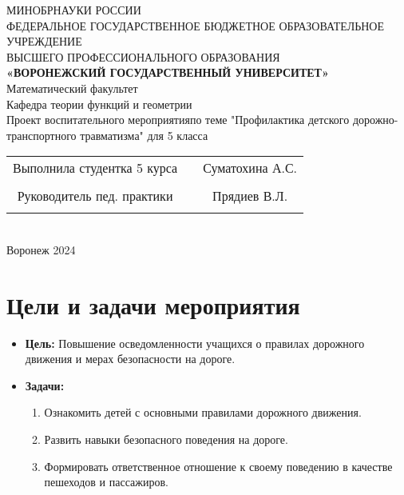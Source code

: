 \documentclass[a4paper,12pt]{article}
\begin{document}
\begin{center}
	\hfill \break
	\large{МИНОБРНАУКИ РОССИИ}\\
	\footnotesize{ФЕДЕРАЛЬНОЕ ГОСУДАРСТВЕННОЕ БЮДЖЕТНОЕ ОБРАЗОВАТЕЛЬНОЕ УЧРЕЖДЕНИЕ}\\
	\footnotesize{ВЫСШЕГО ПРОФЕССИОНАЛЬНОГО ОБРАЗОВАНИЯ}\\
	\small{\textbf{«ВОРОНЕЖСКИЙ ГОСУДАРСТВЕННЫЙ УНИВЕРСИТЕТ»}}\\
	\hfill \break
	\normalsize{Математический факультет}\\
	\hfill \break
	\normalsize{Кафедра теории функций и геометрии}\\
	\hfill\break
	\hfill \break
	\hfill \break
	\hfill \break
	\hfill \break
	\hfill \break
	\hfill \break
	\hfill \break
	\hfill \break
	\large{Проект воспитательного мероприятияпо теме "Профилактика детского дорожно-транспортного травматизма" для 5 класса}\\
	\hfill \break
	\hfill \break
	\hfill \break
\hfill \break
\hfill \break
\hfill \break
\hfill \break
\hfill \break
\hfill \break
\normalsize{
	\begin{tabular}{ccc}
		Выполнила студентка 5 курса & \underline{\hspace{3cm}} &  Суматохина А.С. \\\\
		Руководитель пед. практики & \underline{\hspace{3cm}} & Прядиев В.Л.    \\\\
	\end{tabular}
}\\
\hfill \break
\hfill \break
\hfill \break
\hfill \break
\hfill \break
\hfill \break
\hfill \break
\hfill \break
\hfill \break
\hfill \break
\hfill \break
\hfill \break
\hfill \break
\hfill \break
\hfill \break
\hfill \break
\hfill \break
Воронеж 2024 \end{center}
\newpage

\section*{Цели и задачи мероприятия}
\begin{itemize}
    \item \textbf{Цель:} Повышение осведомленности учащихся о правилах дорожного движения и мерах безопасности на дороге.
    \item \textbf{Задачи:}
    \begin{enumerate}[label=\arabic*]
        \item Ознакомить детей с основными правилами дорожного движения.
        \item Развить навыки безопасного поведения на дороге.
        \item Формировать ответственное отношение к своему поведению в качестве пешеходов и пассажиров.
    \end{enumerate}
\end{itemize}
\end{document}
